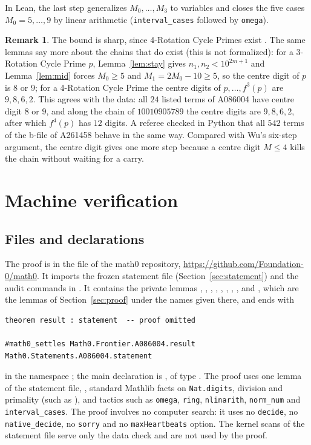 \documentclass[11pt]{amsart}
\theoremstyle{plain}
\theoremstyle{definition}
\newtheorem{remark}[theorem]{Remark}
\begin{document}
In Lean, the last step generalizes $M_0,\dots,M_3$ to variables and closes the five cases $M_0=5,\dots,9$ by linear arithmetic (\texttt{interval\_cases} followed by \texttt{omega}).

\begin{remark}\label{rem:sharp}
The bound is sharp, since 4-Rotation Cycle Primes exist \cite{A261458}. The same lemmas say more about the chains that do exist (this is not formalized): for a 3-Rotation Cycle Prime $p$, Lemma~\ref{lem:stay} gives $n_1,n_2<10^{2m+1}$ and Lemma~\ref{lem:mid} forces $M_0\ge5$ and $M_1=2M_0-10\ge5$, so the centre digit of $p$ is $8$ or $9$; for a 4-Rotation Cycle Prime the centre digits of $p,\dots,f^3(p)$ are $9,8,6,2$. This agrees with the data: all $24$ listed terms of A086004 have centre digit $8$ or $9$, and along the chain of $10010905789$ the centre digits are $9,8,6,2$, after which $f^4(p)$ has $12$ digits. A referee checked in Python that all $542$ terms of the b-file of A261458 behave in the same way. Compared with Wu's six-step argument, the centre digit gives one more step because a centre digit $M\le4$ kills the chain without waiting for a carry.
\end{remark}

\section{Machine verification}\label{sec:lean}

\subsection*{Files and declarations}
The proof is in the file  of the math0 repository, \url{https://github.com/Foundation-0/math0}. It imports the frozen statement file  (Section~\ref{sec:statement}) and the audit commands in . It contains the private lemmas , , , , , , , ,  and , which are the lemmas of Section~\ref{sec:proof} under the names given there, and ends with
\begin{lstlisting}
theorem result : statement  -- proof omitted

#math0_settles Math0.Frontier.A086004.result Math0.Statements.A086004.statement
\end{lstlisting}
in the namespace ; the main declaration is , of type . The proof uses one lemma of the statement file, , standard Mathlib facts on \texttt{Nat.digits}, division and primality (such as ), and tactics such as \texttt{omega}, \texttt{ring}, \texttt{nlinarith}, \texttt{norm\_num} and \texttt{interval\_cases}. The proof involves no computer search: it uses no \texttt{decide}, no \texttt{native\_decide}, no \texttt{sorry} and no \texttt{maxHeartbeats} option. The kernel scans of the statement file serve only the data check  and are not used by the proof.
\end{document}
